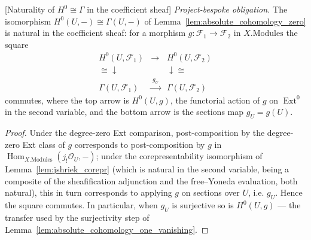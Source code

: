 \begin{lemma}

[Naturality of \(H^0 \cong \Gamma\) in the coefficient sheaf]
  \label{lem:absolute_cohomology_zero_natural}
  \textit{Project-bespoke obligation.}
  The isomorphism \(H^0(U, -) \cong \Gamma(U, -)\) of Lemma~\ref{lem:absolute_cohomology_zero} is
  natural in the coefficient sheaf: for a morphism \(g : \mathcal{F}_1 \to \mathcal{F}_2\) in
  \(X.\mathrm{Modules}\) the square
  \[
    \begin{array}{ccc}
      H^0(U, \mathcal{F}_1) & \longrightarrow & H^0(U, \mathcal{F}_2)\\
      \cong\downarrow & & \downarrow\cong\\
      \Gamma(U, \mathcal{F}_1) & \xrightarrow{\;g_U\;} & \Gamma(U, \mathcal{F}_2)
    \end{array}
  \]
  commutes, where the top arrow is \(H^0(U, g)\), the functorial action of \(g\) on
  \(\operatorname{Ext}^0\) in the second variable, and the bottom arrow is the sections map
  \(g_U = g(U)\).
\end{lemma}
\begin{proof}
  Under the degree-zero Ext comparison, post-composition by the degree-zero Ext class of \(g\)
  corresponds to post-composition by \(g\) in \(\operatorname{Hom}_{X.\mathrm{Modules}}(j_!
  \mathcal{O}_U, -)\); under the corepresentability isomorphism of Lemma~\ref{lem:jshriek_corepr}
  (which is natural in the second variable, being a composite of the sheafification adjunction and
  the free–Yoneda evaluation, both natural), this in turn corresponds to applying \(g\) on sections
  over \(U\), i.e. \(g_U\). Hence the square commutes. In particular, when \(g_U\) is surjective so
  is \(H^0(U, g)\) — the transfer used by the surjectivity step of
  Lemma~\ref{lem:absolute_cohomology_one_vanishing}.
\end{proof}

